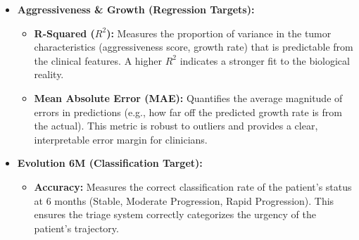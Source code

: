 \begin{itemize}
    \item \textbf{Aggressiveness \& Growth (Regression Targets):}
    \begin{itemize}
        \item \textbf{R-Squared ($R^2$):} Measures the proportion of variance in the tumor characteristics (aggressiveness score, growth rate) that is predictable from the clinical features. A higher $R^2$ indicates a stronger fit to the biological reality.
        \item \textbf{Mean Absolute Error (MAE):} Quantifies the average magnitude of errors in predictions (e.g., how far off the predicted growth rate is from the actual). This metric is robust to outliers and provides a clear, interpretable error margin for clinicians.
    \end{itemize}
    
    \item \textbf{Evolution 6M (Classification Target):}
    \begin{itemize}
        \item \textbf{Accuracy:} Measures the correct classification rate of the patient's status at 6 months (Stable, Moderate Progression, Rapid Progression). This ensures the triage system correctly categorizes the urgency of the patient's trajectory.
    \end{itemize}
\end{itemize}
